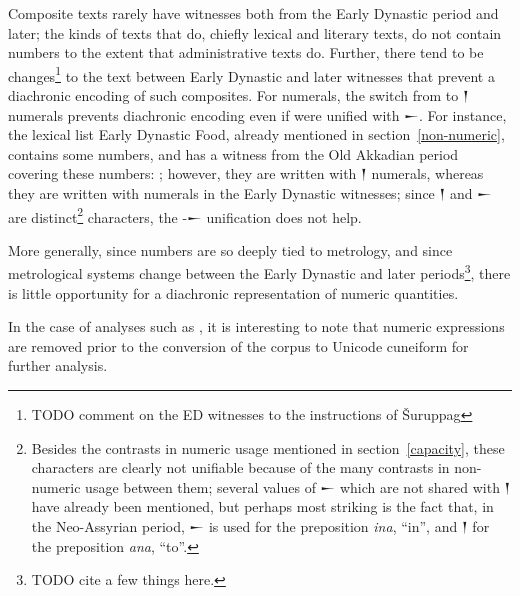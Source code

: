 \documentclass[10pt, a4paper, twoside]{article}
\newcommand\oneAšC{{\proposalfont\symbol{"12550}}} %
\begin{document}
Composite texts rarely have witnesses both from the Early Dynastic period
and later; the kinds of texts that do, chiefly lexical and literary texts, do not
contain numbers to the extent that administrative texts do.
Further, there tend to be changes\footnote{TODO comment on the ED witnesses to the instructions of Šuruppag}
to the text between Early Dynastic
and later witnesses that prevent a diachronic encoding of such composites.
For numerals, the switch from {\oneAšC} to {\xsuxfont 𒁹} numerals prevents
diachronic encoding even if {\oneAšC} were unified with {\xsuxfont 𒀸}.
For instance, the lexical list Early Dynastic Food, already mentioned in section~\ref{non-numeric},
contains some numbers, and has a witness from the Old Akkadian period covering
these numbers: \cite[\href{https://oracc.museum.upenn.edu/dcclt/P215653.3}{a~1′--6′}]{P215653};
however, they are written with {\xsuxfont 𒁹} numerals, whereas they are written with
{\oneAšC} numerals in the Early Dynastic witnesses; since {\xsuxfont 𒁹}
and {\xsuxfont 𒀸} are distinct\footnote{Besides the contrasts in numeric usage
mentioned in section~\ref{capacity}, these characters are clearly
not unifiable because of the many contrasts in non-numeric usage between them;
several values of {\xsuxfont 𒀸} which are not shared with {\xsuxfont 𒁹}
have already been mentioned, but perhaps most striking is the fact that,
in the Neo-Assyrian period, {\xsuxfont 𒀸} is used for the preposition \emph{ina}, ``in'', and
{\xsuxfont 𒁹} for the preposition \emph{ana}, ``to''.}
characters, the {\oneAšC}-{\xsuxfont 𒀸} unification does not help. 


More generally, since numbers are so deeply tied to metrology, and since
metrological systems change between the Early Dynastic and later
periods\footnote{TODO cite a few things here.}, there is little opportunity
for a diachronic representation of numeric quantities.

In the case of analyses such as
\cite[\emph{sub} ``\href{https://github.com/ARomach/Cuneiform-Stylometry/tree/06278f9f9747a897d00fb0418b6eaa14fa573e83\#adding-corpora}{Adding Corpora}'']{Romach2023},
it is interesting to note that numeric expressions are removed prior
to the conversion of the corpus to Unicode cuneiform for further analysis.
\end{document}
